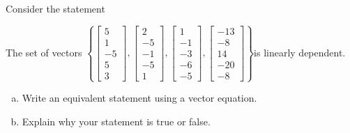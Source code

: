 
\begin{exerciseStatement}


Consider the statement 
\begin{center}\begin{minipage}{0.8\textwidth}
 The set of vectors \( \left\{ \left[\begin{array}{c}
5 \\
1 \\
-5 \\
5 \\
3
\end{array}\right] , \left[\begin{array}{c}
2 \\
-5 \\
-1 \\
-5 \\
1
\end{array}\right] , \left[\begin{array}{c}
1 \\
-1 \\
-3 \\
-6 \\
-5
\end{array}\right] , \left[\begin{array}{c}
-13 \\
-8 \\
14 \\
-20 \\
-8
\end{array}\right] \right\} \)is linearly dependent.
\end{minipage}\end{center}
    


\begin{enumerate}[(a)]
\item  Write an equivalent statement using a vector equation.
\item  Explain why your statement is true or false.
\end{enumerate}
    
\end{exerciseStatement}
    
